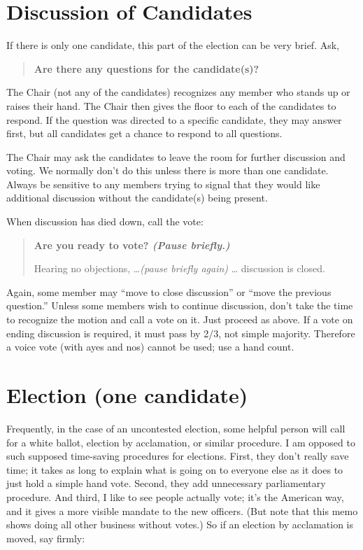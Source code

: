 \documentclass{article}
\newenvironment{chairsays}
               {\parskip 0pt \par %
                \begin{quote}
                 \parskip 0pt \bf}
               {\end{quote}}
\begin{document}
\section{Discussion of Candidates}

If there is only one candidate, this part of the election can be very
brief.  Ask,

\begin{chairsays}
Are there any questions for the candidate(s)?
\end{chairsays}

The Chair (not any of the candidates) recognizes any member who stands
up or raises their hand.  The Chair then gives the floor to each of
the candidates to respond.  If the question was directed to a specific
candidate, they may answer first, but all candidates get a chance to
respond to all questions.

The Chair may ask the candidates to leave the room for further
discussion and voting.  We normally don't do this unless there is more
than one candidate.  Always be sensitive to any members trying to
signal that they would like additional discussion without the
candidate(s) being present.

When discussion has died down, call the vote:
\begin{chairsays}
Are you ready to vote?
{\em (Pause briefly.)}

Hearing no objections, \ldots {\em (pause briefly again)} \ldots
discussion is closed.
\end{chairsays}

Again, some member may ``move to close discussion'' or ``move the
previous question.''  Unless some members wish to continue discussion,
don't take the time to recognize the motion and call a vote on it.
Just proceed as above.  If a vote on ending discussion is
required, it must pass by 2/3, not simple majority.  Therefore a 
voice vote (with ayes and nos) cannot be used; use a hand count.

\section{Election (one candidate)}

Frequently, in the case of an uncontested election, some helpful
person will call for a white ballot, election by acclamation, or
similar procedure.
I am
opposed to such supposed time-saving procedures for elections.  First,
they don't really save time; it takes as long to explain what is going
on to everyone else as it does to just hold a simple hand vote.
Second, they add unnecessary parliamentary procedure.  And third, I
like to see people actually vote; it's the American way, and it gives
a more visible mandate to the new officers.
(But note that this memo shows doing all other business without votes.)
So if an election by acclamation is moved, say firmly:
\end{document}
